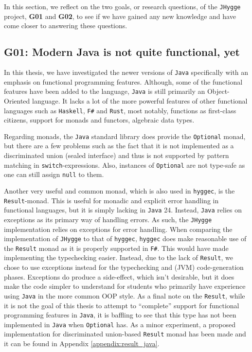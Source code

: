 In this section, we reflect on the two goals, or research questions, of the
\texttt{JHygge} project, \textbf{G01} and \textbf{G02}, to see if we have gained
any new knowledge and have come closer to answering these questions.

\subsection{\textbf{G01}: Modern Java is not quite functional, yet}

In this thesis, we have investigated the newer versions of \texttt{Java} specifically with an emphasis on functional programming features.
Although, some of the functional features have been added to the language, \texttt{Java} is still primarily an Object-Oriented language.
It lacks a lot of the more powerful features of other functional languages such as \texttt{Haskell}, \texttt{F\#} and \texttt{Rust},
most notably, functions as first-class citizens, support for monads and functors, algebraic data types.

Regarding monads, the \texttt{Java} standard library does provide the \texttt{Optional}\cite{java_optional} monad, but there are a few problems such as the
fact that it is not implemented as a discriminated union (sealed interface) and thus is not supported by pattern matching in
\texttt{switch}-expressions. Also, instances of \texttt{Optional} are not type-safe as one can still assign \texttt{null} to them.

Another very useful and common monad, which is also used in \texttt{hyggec}, is the \texttt{Result}-monad. This is useful for monadic
and explicit error handling in functional languages, but it is simply lacking in \texttt{Java} 24. Instead, \texttt{Java} relies on
exceptions as its primary way of handling errors. As such, the \texttt{JHygge} implementation relies on exceptions for error handling.
When comparing the implementation of \texttt{JHygge} to that of \texttt{hyggec}, \texttt{hyggec} does make reasonable use of the \texttt{Result}
monad as it is properly supported in \texttt{F\#}. This would have made implementing the typechecking easier. Instead, due to the lack
of \texttt{Result}, we chose to use exceptions instead for the typechecking and (JVM) code-generation phases. Exceptions do produce a
side-effect, which isn't desirable, but it does make the code simpler to understand for students who primarily have experience using
\texttt{Java} in the more common OOP style. As a final note on the \texttt{Result}, while it is not the goal of this thesis to attempt
to ``complete'' support for functional programming features in \texttt{Java}, it is baffling to see that this type has not been implemented
in \texttt{Java} when \texttt{Optional} has. As a minor experiment, a proposed implementation for discriminated union-based \texttt{Result}
monad has been made and it can be found in Appendix \ref{appendix:result_java}.

